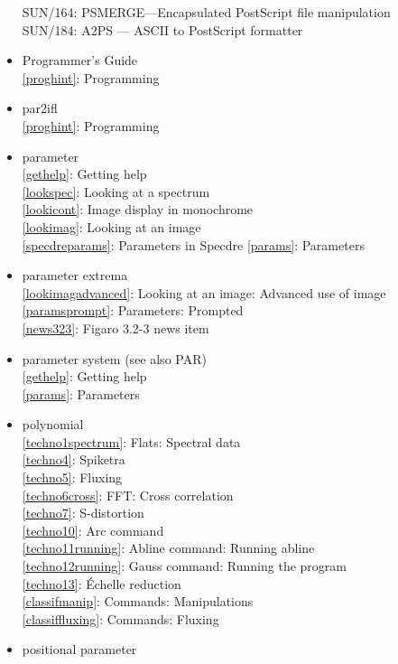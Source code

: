 \documentclass[11pt,twoside]{article}
\newcommand{\htmlref}[2]{#1}
\newcommand{\xref}[3]{#1}
\newcommand{\idxint}[2]{\ref{#1}: \htmlref{#2}{#1}}
\newcommand{\idxint}[2]{\htmlref{#2}{#1}}
\newcommand{\latorhtm}[2]{#1}
\newcommand{\latorhtm}[2]{#2}
\begin{document}
\begin{itemize}
   \xref{SUN/164: PSMERGE\latorhtm{---}{-}Encapsulated Post\-Script file manipulation}{sun164}{}\\
   \xref{SUN/184: A2PS \latorhtm{---}{-} ASCII to PostScript formatter}{sun184}{}
\item Programmer's Guide\\
   \idxint{proghint}{Programming}
\item par2ifl\\
   \idxint{proghint}{Programming}
\item parameter\\
   \idxint{gethelp}{Getting help}\\
   \idxint{lookspec}{Looking at a spectrum}\\
   \idxint{lookicont}{Image display in monochrome}\\
   \idxint{lookimag}{Looking at an image}\\
   \idxint{specdreparams}{Parameters in Specdre}
   \idxint{params}{Parameters}
\item parameter extrema\\
   \idxint{lookimagadvanced}{Looking at an image: Advanced use of image}\\
   \idxint{paramsprompt}{Parameters: Prompted}\\
   \idxint{news323}{Figaro 3.2-3 news item}
\item parameter system (see also PAR)\\
   \idxint{gethelp}{Getting help}\\
   \idxint{params}{Parameters}
\item polynomial\\
   \idxint{techno1spectrum}{Flats: Spectral data}\\
   \idxint{techno4}{Spiketra}\\
   \idxint{techno5}{Fluxing}\\
   \idxint{techno6cross}{FFT: Cross correlation}\\
   \idxint{techno7}{S-distortion}\\
   \idxint{techno10}{Arc command}\\
   \idxint{techno11running}{Abline command: Running abline}\\
   \idxint{techno12running}{Gauss command: Running the program}\\
   \idxint{techno13}{\'Echelle reduction}\\
   \idxint{classifmanip}{Commands: Manipulations}\\
   \idxint{classiffluxing}{Commands: Fluxing}
\item positional parameter\\

\end{itemize}
\end{document}
